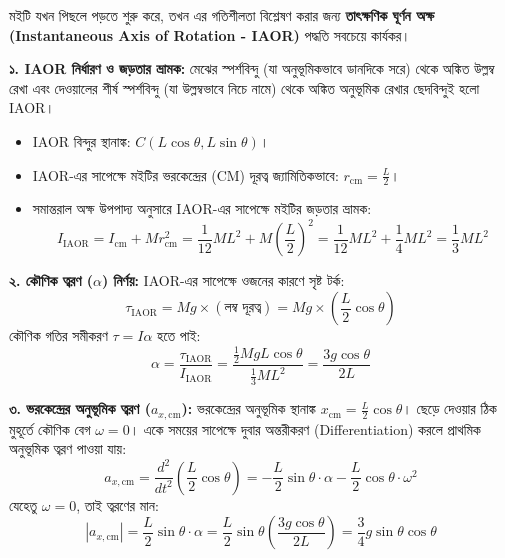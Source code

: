 \documentclass[12pt, a4paper]{article}
\begin{document}
\begin{tcolorbox}[solutionbox={সমাধান (Solution)}]
\noindent
মইটি যখন পিছলে পড়তে শুরু করে, তখন এর গতিশীলতা বিশ্লেষণ করার জন্য \textbf{তাৎক্ষণিক ঘূর্ণন অক্ষ (Instantaneous Axis of Rotation - IAOR)} পদ্ধতি সবচেয়ে কার্যকর।

\vspace{0.5em}
\textbf{১. IAOR নির্ধারণ ও জড়তার ভ্রামক:}
মেঝের স্পর্শবিন্দু (যা অনুভূমিকভাবে ডানদিকে সরে) থেকে অঙ্কিত উল্লম্ব রেখা এবং দেওয়ালের শীর্ষ স্পর্শবিন্দু (যা উল্লম্বভাবে নিচে নামে) থেকে অঙ্কিত অনুভূমিক রেখার ছেদবিন্দুই হলো IAOR।
\begin{itemize}[leftmargin=1.5em, itemsep=0.2em]
    \item IAOR বিন্দুর স্থানাঙ্ক: $C(L \cos\theta, L \sin\theta)$।
    \item IAOR-এর সাপেক্ষে মইটির ভরকেন্দ্রের (CM) দূরত্ব জ্যামিতিকভাবে: $r_{\text{cm}} = \frac{L}{2}$।
    \item সমান্তরাল অক্ষ উপপাদ্য অনুসারে IAOR-এর সাপেক্ষে মইটির জড়তার ভ্রামক:
    $$I_{\text{IAOR}} = I_{\text{cm}} + M r_{\text{cm}}^2 = \frac{1}{12} M L^2 + M \left(\frac{L}{2}\right)^2 = \frac{1}{12} M L^2 + \frac{1}{4} M L^2 = \frac{1}{3} M L^2$$
\end{itemize}

\vspace{0.5em}
\textbf{২. কৌণিক ত্বরণ ($\alpha$) নির্ণয়:}
IAOR-এর সাপেক্ষে ওজনের কারণে সৃষ্ট টর্ক:
$$\tau_{\text{IAOR}} = M g \times \left(\text{লম্ব দূরত্ব}\right) = M g \times \left(\frac{L}{2} \cos\theta\right)$$
কৌণিক গতির সমীকরণ $\tau = I \alpha$ হতে পাই:
$$\alpha = \frac{\tau_{\text{IAOR}}}{I_{\text{IAOR}}} = \frac{\frac{1}{2} M g L \cos\theta}{\frac{1}{3} M L^2} = \frac{3 g \cos\theta}{2 L}$$

\vspace{0.5em}
\textbf{৩. ভরকেন্দ্রের অনুভূমিক ত্বরণ ($a_{x, \text{cm}}$):}
ভরকেন্দ্রের অনুভূমিক স্থানাঙ্ক $x_{\text{cm}} = \frac{L}{2} \cos\theta$। 
ছেড়ে দেওয়ার ঠিক মুহূর্তে কৌণিক বেগ $\omega = 0$। একে সময়ের সাপেক্ষে দুবার অন্তরীকরণ (Differentiation) করলে প্রাথমিক অনুভূমিক ত্বরণ পাওয়া যায়:
$$a_{x, \text{cm}} = \frac{d^2}{dt^2}\left(\frac{L}{2} \cos\theta\right) = -\frac{L}{2} \sin\theta \cdot \alpha - \frac{L}{2} \cos\theta \cdot \omega^2$$
যেহেতু $\omega = 0$, তাই ত্বরণের মান:
$$|a_{x, \text{cm}}| = \frac{L}{2} \sin\theta \cdot \alpha = \frac{L}{2} \sin\theta \left(\frac{3 g \cos\theta}{2 L}\right) = \frac{3}{4} g \sin\theta \cos\theta$$


\end{tcolorbox}
\end{document}
